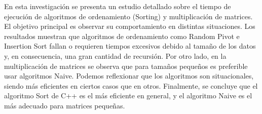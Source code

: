 





En esta investigación se presenta un estudio detallado sobre el tiempo de ejecución de algoritmos de ordenamiento (Sorting) y multiplicación de matrices. El objetivo principal es observar su comportamiento en distintas situaciones. Los resultados muestran que algoritmos de ordenamiento como Random Pivot e Insertion Sort fallan o requieren tiempos excesivos debido al tamaño de los datos y, en consecuencia, una gran cantidad de recursión. Por otro lado, en la multiplicación de matrices se observa que para tamaños pequeños es preferible usar algoritmos Naive. Podemos reflexionar que los algoritmos son situacionales, siendo más eficientes en ciertos casos que en otros. Finalmente, se concluye que el algoritmo Sort de C++ es el más eficiente en general, y el algoritmo Naive es el más adecuado para matrices pequeñas.
